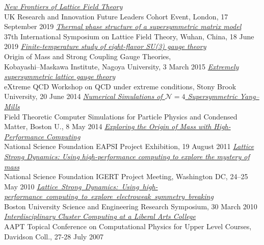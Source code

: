 \begin{spacelist}
\begin{revnumerate}
\vspace{18 pt} \hspace{-22 pt}{\large \bfseries Posters} \vspace{-8 pt}
    \pagebreakitem
      \textit{\href{http://www.davidschaich.net/talks/1909UKRI.pdf}{New Frontiers of Lattice Field Theory}} \\
      UK Research and Innovation Future Leaders Cohort Event, London, 17 September 2019
    \pagebreakitem
      \textit{\href{http://www.davidschaich.net/talks/1906Lattice-poster.pdf}{Thermal phase structure of a supersymmetric matrix model}} \\
      37th International Symposium on Lattice Field Theory, Wuhan, China, 18 June 2019
    \pagebreakitem
      \textit{\href{http://www.davidschaich.net/talks/SCGTposter.pdf}{Finite-temperature study of eight-flavor SU(3) gauge theory}} \\
      Origin of Mass and Strong Coupling Gauge Theories, \\ Kobayashi--Maskawa Institute, Nagoya University, 3 March 2015
    \pagebreakitem
      \textit{\href{http://www.davidschaich.net/talks/XQCD14.pdf}{Extremely supersymmetric lattice gauge theory}} \\
      eXtreme QCD Workshop on QCD under extreme conditions, Stony Brook University, 20 June 2014
    \pagebreakitem
      \textit{\href{http://www.davidschaich.net/talks/PPCM14.pdf}{Numerical Simulations of $\mathcal N = 4$ Supersymmetric Yang--Mills}} \\
      Field Theoretic Computer Simulations for Particle Physics and Condensed Matter, Boston U., 8 May 2014
    \pagebreakitem
      \textit{\href{http://www.davidschaich.net/talks/SITposter.pdf}{Exploring the Origin of Mass with High-Performance Computing}} \\
      National Science Foundation EAPSI Project Exhibition, 19 August 2011
    \pagebreakitem
      \textit{\href{http://www.davidschaich.net/talks/IGERT.pdf}{Lattice Strong Dynamics: Using high-performance computing to explore the mystery of mass}} \\
      National Science Foundation IGERT Project Meeting, Washington DC, 24--25 May 2010
    \pagebreakitem
      \textit{\href{http://www.davidschaich.net/talks/BUsymposium.pdf}{Lattice~Strong~Dynamics:~Using~high-performance~computing~to~explore~electroweak~symmetry~breaking}} \\
      Boston University Science and Engineering Research Symposium, 30 March 2010
    \pagebreakitem
      \textit{\href{http://www.davidschaich.net/talks/AAPT07.pdf}{Interdisciplinary Cluster Computing at a Liberal Arts College}} \\
      AAPT Topical Conference on Computational Physics for Upper Level Courses, Davidson Coll., 27-28 July 2007
  \end{revnumerate}
\end{spacelist}
